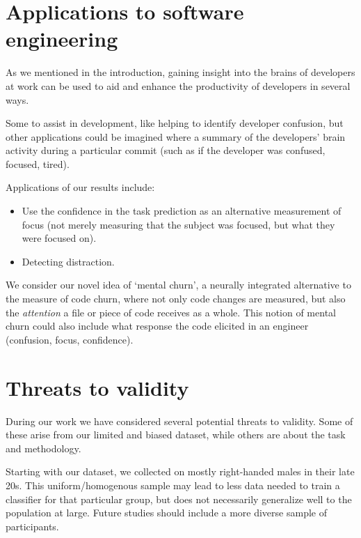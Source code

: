
\section{Applications to software engineering}

As we mentioned in the introduction, gaining insight into the brains of developers at work can be used to aid and enhance the productivity of developers in several ways.

Some to assist in development, like helping to identify developer confusion, but other applications could be imagined where a summary of the developers' brain activity during a particular commit (such as if the developer was confused, focused, tired).


Applications of our results include:

\begin{itemize}
    \item Use the confidence in the task prediction as an alternative measurement of focus (not merely measuring that the subject was focused, but what they were focused on). 
    \item Detecting distraction.
\end{itemize}

We consider our novel idea of `mental churn', a neurally integrated alternative to the measure of code churn, where not only code changes are measured, but also the \emph{attention} a file or piece of code receives as a whole. This notion of mental churn could also include what response the code elicited in an engineer (confusion, focus, confidence).

\section{Threats to validity}\label{section:threats}

    During our work we have considered several potential threats to validity. Some of these arise from our limited and biased dataset, while others are about the task and methodology.

    Starting with our dataset, we collected on mostly right-handed males in their late 20s. This uniform/homogenous sample may lead to less data needed to train a classifier for that particular group, but does not necessarily generalize well to the population at large. Future studies should include a more diverse sample of participants.

